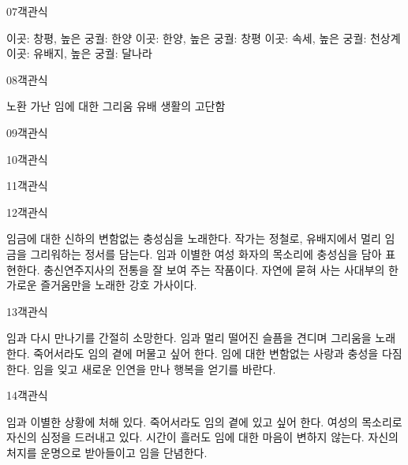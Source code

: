 \documentclass[fs9,seriesRus]{korfarm-base}
\begin{document}
\begin{kfQBlock}{07}{객관식}
\begin{kfChoices}
\kfChoice 이곳: 창평, 높은 궁궐: 한양
\kfChoice 이곳: 한양, 높은 궁궐: 창평
\kfChoice 이곳: 속세, 높은 궁궐: 천상계
\kfChoice 이곳: 유배지, 높은 궁궐: 달나라
\end{kfChoices}
\end{kfQBlock}
\begin{kfQBlock}{08}{객관식}
\begin{kfChoices}
\kfChoice 노환
\kfChoice 가난
\kfChoice 임에 대한 그리움
\kfChoice 유배 생활의 고단함
\end{kfChoices}
\end{kfQBlock}
\begin{kfQBlock}{09}{객관식}
\kfQStem{}
\end{kfQBlock}
\begin{kfQBlock}{10}{객관식}
\kfQStem{}
\end{kfQBlock}
\begin{kfQBlock}{11}{객관식}
\kfQStem{}
\end{kfQBlock}
\begin{kfQBlock}{12}{객관식}
\begin{kfChoices}
\kfChoice 임금에 대한 신하의 변함없는 충성심을 노래한다.
\kfChoice 작가는 정철로, 유배지에서 멀리 임금을 그리워하는 정서를 담는다.
\kfChoice 임과 이별한 여성 화자의 목소리에 충성심을 담아 표현한다.
\kfChoice 충신연주지사의 전통을 잘 보여 주는 작품이다.
\kfChoice 자연에 묻혀 사는 사대부의 한가로운 즐거움만을 노래한 강호 가사이다.
\end{kfChoices}
\end{kfQBlock}
\begin{kfQBlock}{13}{객관식}
\begin{kfChoices}
\kfChoice 임과 다시 만나기를 간절히 소망한다.
\kfChoice 임과 멀리 떨어진 슬픔을 견디며 그리움을 노래한다.
\kfChoice 죽어서라도 임의 곁에 머물고 싶어 한다.
\kfChoice 임에 대한 변함없는 사랑과 충성을 다짐한다.
\kfChoice 임을 잊고 새로운 인연을 만나 행복을 얻기를 바란다.
\end{kfChoices}
\end{kfQBlock}
\begin{kfQBlock}{14}{객관식}
\begin{kfChoices}
\kfChoice 임과 이별한 상황에 처해 있다.
\kfChoice 죽어서라도 임의 곁에 있고 싶어 한다.
\kfChoice 여성의 목소리로 자신의 심정을 드러내고 있다.
\kfChoice 시간이 흘러도 임에 대한 마음이 변하지 않는다.
\kfChoice 자신의 처지를 운명으로 받아들이고 임을 단념한다.
\end{kfChoices}
\end{kfQBlock}
\end{document}

